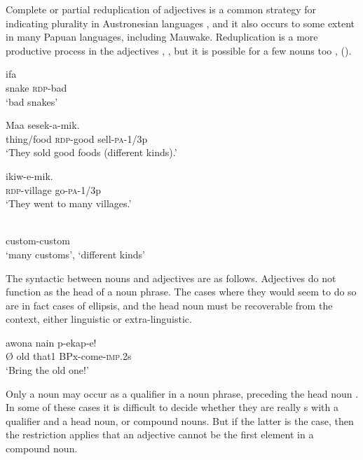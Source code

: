 Complete or partial reduplication of adjectives is a common strategy for indicating plurality in Austronesian languages \citep[62]{Wurm1982}, and it also occurs to some extent in many Papuan languages, including Mauwake. Reduplication is a more productive process in the adjectives , , but it is possible for a few nouns too ,  (). 

\ea%
\label{ex:3:x12}
\gll ifa  \\
snake \textsc{rdp}-bad\\
\glt`bad snakes'
\z

\ea%
\label{ex:3:x481}
\gll Maa  sesek-a-mik. \\
thing/food \textsc{rdp}-good sell-\textsc{pa}-1/3p\\
\glt`They sold good foods (different kinds).'
\z

\ea%
\label{ex:3:x13}
\gll {} ikiw-e-mik. \\
\textsc{rdp}-village go-\textsc{pa}-1/3p\\
\glt`They went to many villages.'
\z

\ea%
\label{ex:3:x1859}
\gll {} \\
custom-custom\\
\glt`many customs', `different kinds'
\z

The syntactic  between nouns and adjectives are as follows. Adjectives do not function as the head of a noun phrase. The cases where they would seem to do so are in fact cases of ellipsis, and the head noun must be recoverable from the context, either linguistic or extra-linguistic. 

\ea%
\label{ex:3:x14}
\gll {\O} awona nain p-ekap-e! \\
{\O} old that1 BPx-come-\textsc{imp}.2s\\
\glt`Bring the old one!'
\z

Only a noun may occur as a qualifier in a noun phrase, preceding the head noun . In some of these cases it is difficult to decide whether they are really s with a qualifier and a head noun, or compound nouns. But if the latter is the case, then the restriction applies that an adjective cannot be the first element in a compound noun.

